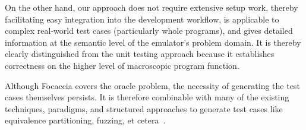 On the other hand, our approach does not require extensive setup work, thereby facilitating easy integration into the
development workflow, is applicable to complex real-world test cases (particularly whole programs), and gives detailed
information at the semantic level of the emulator's problem domain. It is thereby clearly distinguished from the unit
testing approach because it establishes correctness on the higher level of macroscopic program function.

Although Focaccia covers the oracle problem, the necessity of generating the test cases themselves persists. It is
therefore combinable with many of the existing techniques, paradigms, and structured approaches to generate test
cases like equivalence partitioning, fuzzing, et cetera~\cite{jan2016innovative, yu2011robust_planning}.

